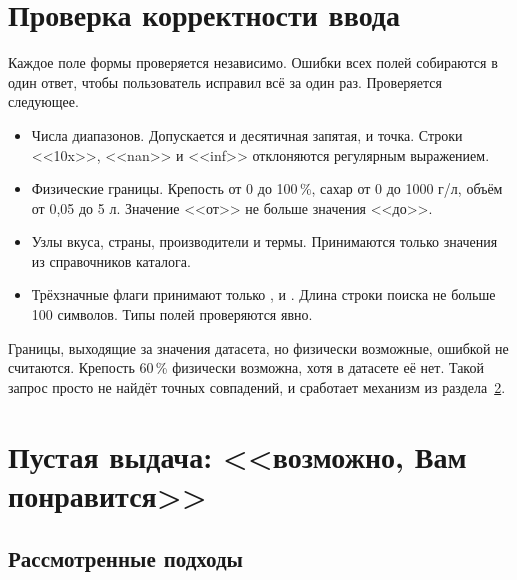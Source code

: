 \section{Проверка корректности ввода}

Каждое поле формы проверяется независимо. Ошибки всех полей собираются в один ответ, чтобы пользователь исправил всё за один раз. Проверяется следующее.
\begin{itemize}[leftmargin=1.6\parindent, label*=---]
	\item Числа диапазонов. Допускается и десятичная запятая, и точка. Строки <<10x>>, <<nan>> и <<inf>> отклоняются регулярным выражением.
	\item Физические границы. Крепость от 0 до 100\,\%, сахар от 0 до 1000 г/л, объём от 0,05 до 5 л. Значение <<от>> не больше значения <<до>>.
	\item Узлы вкуса, страны, производители и термы. Принимаются только значения из справочников каталога.
	\item Трёхзначные флаги принимают только ,  и . Длина строки поиска не больше 100 символов. Типы полей проверяются явно.
\end{itemize}
Границы, выходящие за значения датасета, но физически возможные, ошибкой не считаются. Крепость 60\,\% физически возможна, хотя в датасете её нет. Такой запрос просто не найдёт точных совпадений, и сработает механизм из раздела~\ref{sec:lr4_fallback}.

\section{Пустая выдача: <<возможно, Вам понравится>>}
\label{sec:lr4_fallback}

\subsection{Рассмотренные подходы}

